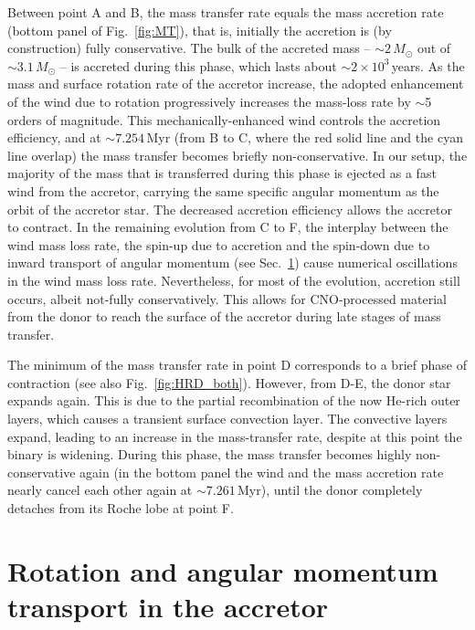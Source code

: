 \documentclass[twocolumn,twocolappendix,trackchanges]{aastex63}
\DeclareRobustCommand{\Figref}[1]{Fig.~\ref{#1}}
\DeclareRobustCommand{\Secref}[1]{Sec.~\ref{#1}}
\begin{document}
Between point A and B, the mass transfer rate equals the
mass accretion rate (bottom panel of \Figref{fig:MT}), that is,
initially the accretion is (by construction) fully conservative. The
bulk of the accreted mass -- $\sim{}2\,M_\odot$ out of
$\sim{}3.1\,M_\odot$ -- is accreted during this phase, which
lasts about $\sim{}2\times10^3$\,years. As the mass and surface
rotation rate of the accretor increase, the adopted
enhancement of the wind due to rotation progressively increases the
mass-loss rate by $\sim$5 orders of magnitude. This
mechanically-enhanced wind controls the accretion efficiency, and at
$\sim{}7.254$\,Myr (from B to C, where the red solid line and the cyan
line overlap) the mass transfer becomes briefly non-conservative. In
our setup, the majority of the mass that is transferred during this phase is
ejected as a fast wind from the accretor, carrying the same specific
angular momentum as the orbit of the accretor star. The decreased
accretion efficiency allows the accretor to contract. In the remaining evolution from C to F,
the interplay between the wind mass loss rate, the spin-up due to
accretion and the spin-down due to inward transport of angular
momentum (see \Secref{sec:rot}) cause numerical oscillations in the wind
mass loss rate. Nevertheless, for most of the evolution, accretion
still occurs, albeit not-fully conservatively. This allows for
CNO-processed material from the donor to reach the surface of the
accretor during late stages of mass transfer.

The minimum of the mass transfer rate in point D corresponds to a
brief phase of contraction (see also \Figref{fig:HRD_both}). However,
from D-E, the donor star expands again.  This is due to the
partial recombination of the now He-rich outer layers, which causes a
transient surface convection layer. The convective layers expand,
leading to an increase in the mass-transfer rate, despite at this
point %
the binary %
is widening. During this phase, the mass transfer becomes highly
non-conservative again (in the bottom panel the wind and the mass
accretion rate nearly cancel each other again at $\sim7.261$\,Myr),
until the donor completely detaches from its Roche lobe at point F.


\section{Rotation and angular momentum transport in the accretor}
\label{sec:rot}
\end{document}
